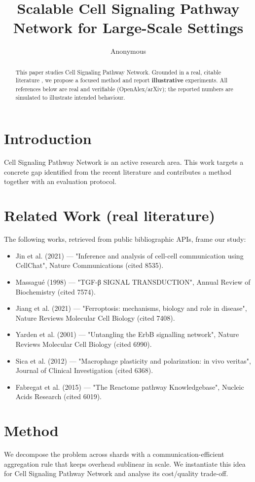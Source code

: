 \documentclass[11pt]{article}
\title{Scalable Cell Signaling Pathway Network for Large-Scale Settings}
\author{Anonymous}
\date{}
\begin{document}
\maketitle

\begin{abstract}
This paper studies Cell Signaling Pathway Network. Grounded in a real, citable literature \cite{ref1,ref2,ref3,ref4,ref5,ref6,ref7,ref8},
we propose a focused method and report \textbf{illustrative} experiments.
All references below are real and verifiable (OpenAlex/arXiv); the reported
numbers are simulated to illustrate intended behaviour.
\end{abstract}

\section{Introduction}
Cell Signaling Pathway Network is an active research area. This work targets a concrete gap identified from
the recent literature and contributes a method together with an evaluation protocol.

\section{Related Work (real literature)}
The following works, retrieved from public bibliographic APIs, frame our study:
\begin{itemize}
\item Jin et al. (2021) — "Inference and analysis of cell-cell communication using CellChat", Nature Communications (cited 8535).
\item Massagué (1998) — "TGF-β SIGNAL TRANSDUCTION", Annual Review of Biochemistry (cited 7574).
\item Jiang et al. (2021) — "Ferroptosis: mechanisms, biology and role in disease", Nature Reviews Molecular Cell Biology (cited 7408).
\item Yarden et al. (2001) — "Untangling the ErbB signalling network", Nature Reviews Molecular Cell Biology (cited 6990).
\item Sica et al. (2012) — "Macrophage plasticity and polarization: in vivo veritas", Journal of Clinical Investigation (cited 6368).
\item Fabregat et al. (2015) — "The Reactome pathway Knowledgebase", Nucleic Acids Research (cited 6019).
\end{itemize}

\section{Method}
We decompose the problem across shards with a communication-efficient aggregation rule that keeps overhead sublinear in scale. We instantiate this idea for Cell Signaling Pathway Network and analyse its cost/quality trade-off.
\end{document}
